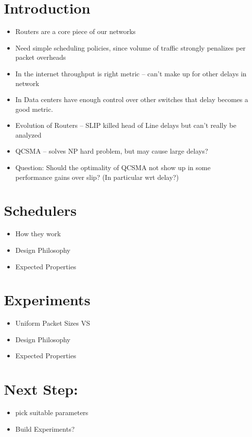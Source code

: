 \documentclass{IEEEtran}%
\begin{document}
\section{Introduction}
\begin{itemize}
\item Routers are a core piece of our networks
\item Need simple scheduling policies, since volume of traffic strongly penalizes per packet overheads 
\item In the internet throughput is right metric -- can't make up for other delays in network
\item In Data centers have enough control over other switches that delay becomes a good metric.
\item Evolution of Routers -- SLIP killed head of Line delays but can't really be analyzed
\item QCSMA -- solves NP hard problem, but may cause large delays?
\item Question:  Should the optimality of QCSMA not show up in some performance gains over slip?  (In particular wrt delay?)
\end{itemize}

\section{Schedulers}
\begin{itemize}
\item How they work
\item Design Philosophy
\item Expected Properties
\end{itemize}

\section{Experiments}
\begin{itemize}
\item Uniform Packet Sizes VS 
\item Design Philosophy
\item Expected Properties
\end{itemize}

\section{Next Step:}
\begin{itemize}
\item pick suitable parameters
\item Build Experiments?
\end{itemize}
\end{document}
